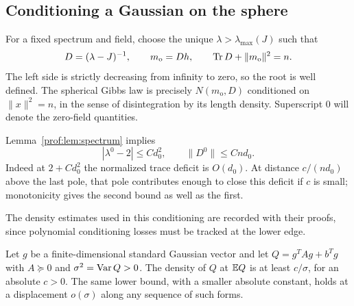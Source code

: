 \subsection{Conditioning a Gaussian on the sphere}
\label{prof:subsec:spherical}

For a fixed spectrum and field, choose the unique $\lambda>\lambda_{\max}(J)$
such that
\begin{equation}\label{prof:eq:spherical-root}
 D=(\lambda-J)^{-1},\qquad m_{\mathrm o}=Dh,
 \qquad \operatorname{Tr} D+\|m_{\mathrm o}\|^2=n.
\end{equation}
The left side is strictly decreasing from infinity to zero, so the
root is well defined.  The spherical Gibbs law is precisely
$N(m_{\mathrm o},D)$ conditioned on $\|x\|^2=n$, in the sense of
disintegration by its length density.  Superscript $0$ will denote
the zero-field quantities.

Lemma~\ref{prof:lem:spectrum} implies
\begin{equation}\label{prof:eq:zero-shell}
 |\lambda^0-2|\le Cd_0^2,\qquad \|D^0\|\le Cnd_0.
\end{equation}
Indeed at $2+Cd_0^2$ the normalized trace deficit is $O(d_0)$.
At distance $c/(nd_0)$ above the last pole, that pole contributes
enough to close this deficit if $c$ is small; monotonicity gives the
second bound as well as the first.

The density estimates used in this conditioning are recorded with
their proofs, since polynomial conditioning losses must be tracked
at the lower edge.

\begin{lemma}\label{prof:quadratic-mean-density}
Let $g$ be a finite-dimensional standard Gaussian vector and let
$Q=g^TAg+b^Tg$ with $A\succeq0$ and $\sigma^2=\operatorname{Var} Q>0$.
The density of $Q$ at $\mathbb E Q$ is at least $c/\sigma$, for an absolute
$c>0$.  The same lower bound, with a smaller absolute constant,
holds at a displacement $o(\sigma)$ along any sequence of such forms.
\end{lemma}


